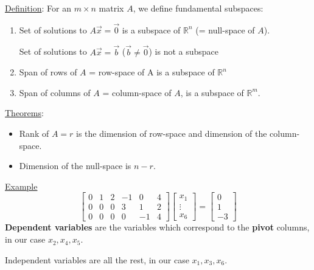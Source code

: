 \documentclass{article}
\newcommand{\tmstrong}[1]{\textbf{#1}}
\begin{document}
{\underline{Definition}}: For an $m \times n$ matrix $A$, we define
fundamental subspaces:
\begin{enumerate}
  \item Set of solutions to $A \vec{x} = \vec{0}$ is a subspace of
  $\mathbb{R}^n$ (= null-space of $A$).
  
  Set of solutions to $A \vec{x} = \vec{b}$ ($\vec{b} \neq \vec{0}$) is not a
  subspace
  
  \item Span of rows of $A$ = row-space of A is a subspace of $\mathbb{R}^n$
  
  \item Span of columns of $A$ = column-space of $A$, is a subspace of
  $\mathbb{R}^m$.
\end{enumerate}
{\underline{Theorems}}:
\begin{itemize}
  \item Rank of $A = r$ is the dimension of row-space and dimension of the
  column-space.
\end{itemize}
\begin{itemize}
  \item Dimension of the null-space is $n - r$.
\end{itemize}
{\underline{Example}}
\[ \left[\begin{array}{cccccc}
     0 & 1 & 2 & - 1 & 0 & 4\\
     0 & 0 & 0 & 3 & 1 & 2\\
     0 & 0 & 0 & 0 & - 1 & 4
   \end{array}\right] \left[\begin{array}{c}
     x_1\\
     \vdots\\
     x_6
   \end{array}\right] = \left[\begin{array}{c}
     0\\
     1\\
     - 3
   \end{array}\right] \]
{\tmstrong{Dependent variables}} are the variables which correspond to the
{\tmstrong{pivot}} columns, in our case $x_2, x_4, x_5$.

Independent variables are all the rest, in our case $x_1, x_3, x_6$.
\end{document}
